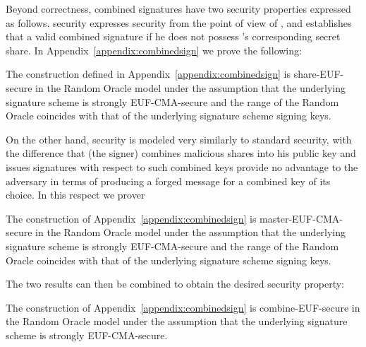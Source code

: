   Beyond correctness, combined signatures have two security properties expressed
  as follows.  security expresses security from the
  point of view of \alice{}, and establishes that \bob{}  a
  valid combined signature if he does not possess \alice's corresponding secret
  share. In Appendix~\ref{appendix:combinedsign} we prove the following:

  \begin{lemma}
    \label{lemma:comb:share}
    The construction defined in Appendix~\ref{appendix:combinedsign} is
    \textsf{share-EUF}-secure in the Random Oracle model under the assumption
    that the underlying signature scheme is strongly \textsf{EUF-CMA}-secure and
    the range of the Random Oracle coincides with that of the underlying
    signature scheme signing keys.
  \end{lemma}

  On the other hand,  security is modeled very
  similarly to standard  security, with the difference
  that \bob{} (the signer) combines malicious shares into his public key and
  issues signatures with respect to such combined keys provide no advantage to the adversary
  in terms of producing a forged message for a combined key of its choice. In
  this respect we prover

  \begin{lemma}
    \label{lemma:comb:master}
    The construction of Appendix~\ref{appendix:combinedsign} is
    \textsf{master-EUF-CMA}-secure in the Random Oracle model under the
    assumption that the underlying signature scheme is strongly
    \textsf{EUF-CMA}-secure and the range of the Random Oracle coincides with
    that of the underlying signature scheme signing keys.
  \end{lemma}

  The two results can then be combined to obtain the desired security property:

  \begin{theorem}
    \label{thm:combsign}
    The construction of Appendix~\ref{appendix:combinedsign} is
    \textsf{combine-EUF}-secure in the Random Oracle model under the assumption
    that the underlying signature scheme is strongly \textsf{EUF-CMA}-secure.
  \end{theorem}
